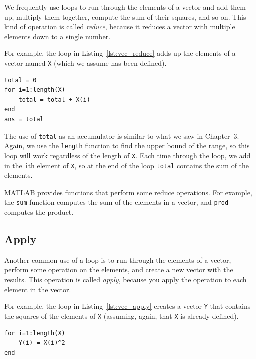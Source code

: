 We frequently use loops to run through the elements of a vector
and add them up, multiply them together, compute the sum
of their squares, and so on.  This kind of operation is called \emph{reduce},
because it reduces a vector with multiple elements down to a single
number.


For example, the loop in Listing~\ref{lst:vec_reduce} adds up the elements of a vector named \lstinline{X} (which we assume has been defined).

\begin{lstlisting}[caption={Reducing a vector to a single scalar value (the sum)}, label={lst:vec_reduce}]
total = 0
for i=1:length(X)
    total = total + X(i)
end
ans = total
\end{lstlisting}

The use of \lstinline{total} as an accumulator is similar to what we
saw in Chapter~3.  Again, we use the \lstinline{length} function
to find the upper bound of the range, so this loop will work
regardless of the length of \lstinline{X}.
Each time through the loop, we add
in the \lstinline{i}th element of \lstinline{X}, so at the end of the loop
\lstinline{total} contains the sum of the elements.


MATLAB provides functions that perform some reduce operations.
For example, the \lstinline{sum} function computes the sum of the elements
in a vector, and \lstinline{prod} computes the product.


\subsection{Apply}
\label{apply}

Another common use of a loop is to run through the elements of
a vector, perform some operation on the elements, and create
a new vector with the results.  This operation is called
\emph{apply}, because you apply the operation to each element in
the vector.


For example, the loop in Listing~\ref{lst:vec_apply} creates a vector \lstinline{Y} that
contains the squares of the elements of \lstinline{X} (assuming, again, that \lstinline{X} is already defined).

\begin{lstlisting}[caption={Making a new vector Y by squaring the elements in X}, label={lst:vec_apply}]
for i=1:length(X)
    Y(i) = X(i)^2
end
\end{lstlisting}

